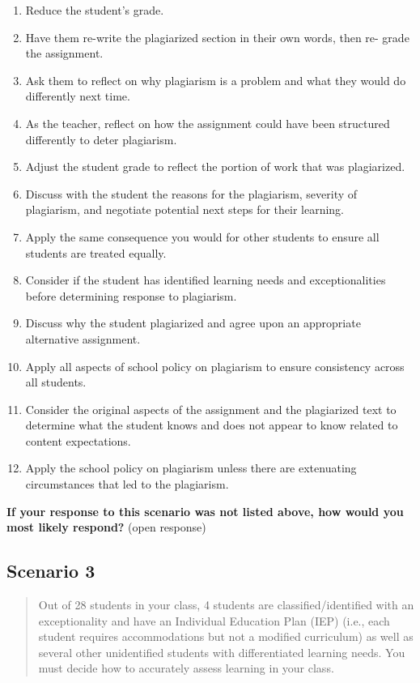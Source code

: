 \documentclass[
]{book}
\providecommand{\tightlist}{%
  \setlength{\itemsep}{0pt}\setlength{\parskip}{0pt}}
\begin{document}
\begin{enumerate}
\def\labelenumi{\arabic{enumi}.}
\tightlist
\item
  Reduce the student's grade.
\item
  Have them re-write the plagiarized section in their own words, then re- grade the assignment.
\item
  Ask them to reflect on why plagiarism is a problem and what they would do differently next time.
\item
  As the teacher, reflect on how the assignment could have been structured differently to deter plagiarism.
\item
  Adjust the student grade to reflect the portion of work that was plagiarized.
\item
  Discuss with the student the reasons for the plagiarism, severity of plagiarism, and negotiate potential next steps for their learning.
\item
  Apply the same consequence you would for other students to ensure all students are treated equally.
\item
  Consider if the student has identified learning needs and exceptionalities before determining response to plagiarism.
\item
  Discuss why the student plagiarized and agree upon an appropriate alternative assignment.
\item
  Apply all aspects of school policy on plagiarism to ensure consistency across all students.
\item
  Consider the original aspects of the assignment and the plagiarized text to determine what the student knows and does not appear to know related to content expectations.
\item
  Apply the school policy on plagiarism unless there are extenuating circumstances that led to the plagiarism.
\end{enumerate}

\textbf{If your response to this scenario was not listed above, how would you most likely respond?} (open response)

\hypertarget{scenario-3-1}{%
\subsection{Scenario 3}\label{scenario-3-1}}

\begin{quote}
Out of 28 students in your class, 4 students are classified/identified with an exceptionality and have an Individual Education Plan (IEP) (i.e., each student requires accommodations but not a modified curriculum) as well as several other unidentified students with differentiated learning needs. You must decide how to accurately assess learning in your class.
\end{quote}
\end{document}

